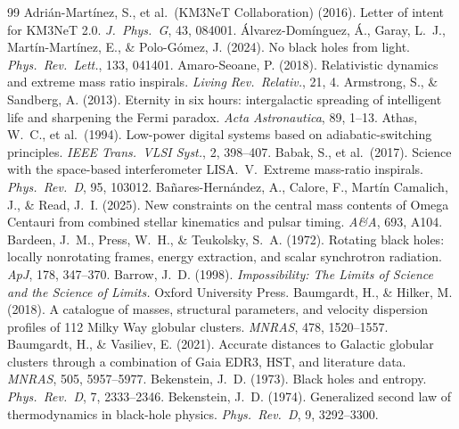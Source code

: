 \documentclass[11pt]{article}
\begin{document}
\begin{thebibliography}{99}
\small
{} Adri\'an-Mart\'inez, S., et al.\ (KM3NeT Collaboration) (2016). Letter of intent for KM3NeT 2.0. \emph{J.\ Phys.\ G}, 43, 084001.
 \'Alvarez-Dom\'inguez, \'A., Garay, L.~J., Mart\'in-Mart\'inez, E., \& Polo-G\'omez, J. (2024). No black holes from light. \emph{Phys.\ Rev.\ Lett.}, 133, 041401.
 Amaro-Seoane, P. (2018). Relativistic dynamics and extreme mass ratio inspirals. \emph{Living Rev.\ Relativ.}, 21, 4.
 Armstrong, S., \& Sandberg, A. (2013). Eternity in six hours: intergalactic spreading of intelligent life and sharpening the Fermi paradox. \emph{Acta Astronautica}, 89, 1--13.
 Athas, W.~C., et al.\ (1994). Low-power digital systems based on adiabatic-switching principles. \emph{IEEE Trans.\ VLSI Syst.}, 2, 398--407.
 Babak, S., et al.\ (2017). Science with the space-based interferometer LISA.\ V.\ Extreme mass-ratio inspirals. \emph{Phys.\ Rev.\ D}, 95, 103012.
 Ba\~nares-Hern\'andez, A., Calore, F., Mart\'in Camalich, J., \& Read, J.~I. (2025). New constraints on the central mass contents of Omega Centauri from combined stellar kinematics and pulsar timing. \emph{A\&A}, 693, A104.
 Bardeen, J.~M., Press, W.~H., \& Teukolsky, S.~A. (1972). Rotating black holes: locally nonrotating frames, energy extraction, and scalar synchrotron radiation. \emph{ApJ}, 178, 347--370.
 Barrow, J.~D. (1998). \emph{Impossibility: The Limits of Science and the Science of Limits.} Oxford University Press.
 Baumgardt, H., \& Hilker, M. (2018). A catalogue of masses, structural parameters, and velocity dispersion profiles of 112 Milky Way globular clusters. \emph{MNRAS}, 478, 1520--1557.
 Baumgardt, H., \& Vasiliev, E. (2021). Accurate distances to Galactic globular clusters through a combination of Gaia EDR3, HST, and literature data. \emph{MNRAS}, 505, 5957--5977.
 Bekenstein, J.~D. (1973). Black holes and entropy. \emph{Phys.\ Rev.\ D}, 7, 2333--2346.
 Bekenstein, J.~D. (1974). Generalized second law of thermodynamics in black-hole physics. \emph{Phys.\ Rev.\ D}, 9, 3292--3300.

\end{thebibliography}
\end{document}
